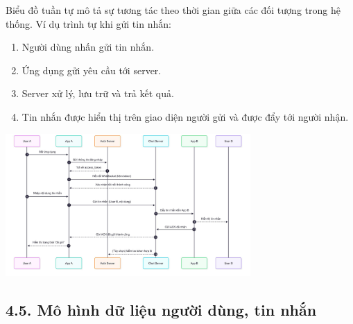 \documentclass[12pt,a4paper]{article}
\begin{document}
	\noindent
	Biểu đồ tuần tự mô tả sự tương tác theo thời gian giữa các đối tượng trong hệ thống. Ví dụ trình tự khi gửi tin nhắn:
	\begin{enumerate}
		\item Người dùng nhấn gửi tin nhắn.
		\item Ứng dụng gửi yêu cầu tới server.
		\item Server xử lý, lưu trữ và trả kết quả.
		\item Tin nhắn được hiển thị trên giao diện người gửi và được đẩy tới người nhận.
	\end{enumerate}
	\includegraphics[width=0.7\textwidth]{sodotuantu.jpg}\\[0.5cm]
	
	\vspace{0.7cm}
	
	\subsection*{4.5. Mô hình dữ liệu người dùng, tin nhắn}
	\vspace{0.1cm}
	
\end{document}
